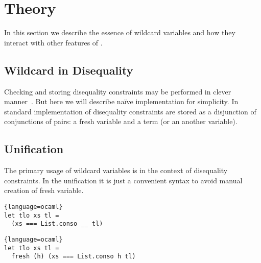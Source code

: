 
\section{Theory}
\label{sec:theory}

In this section we describe the essence of wildcard variables and how they interact with other features of \miniKanren{}.

\subsection{Wildcard in Disequality}
Checking and storing disequality constraints may be performed in clever manner~\cite{fasterMK}. But here we will describe na\"{i}ve implementation for simplicity. In standard implementation of disequality constraints are stored as a disjunction of conjunctions of pairs: a fresh variable and a term (or an another variable).


\subsection{Unification}
The primary usage of wildcard variables is in the context of disequality constraints. In the unification it is just a convenient syntax to avoid manual creation of fresh variable. 

\begin{minipage}{7cm}
\begin{lstlisting}{language=ocaml}
let tlo xs tl = 
  (xs === List.conso __ tl)
\end{lstlisting}
\end{minipage}
\begin{minipage}{9.5cm}
\begin{lstlisting}{language=ocaml}
let tlo xs tl = 
  fresh (h) (xs === List.conso h tl)
\end{lstlisting}
\end{minipage}
